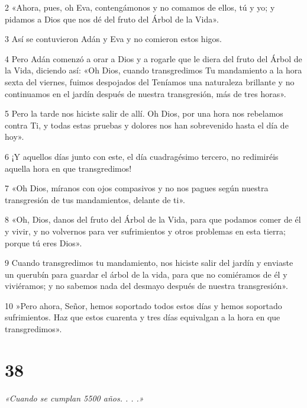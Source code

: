 \par 2 «Ahora, pues, oh Eva, contengámonos y no comamos de ellos, tú y yo; y pidamos a Dios que nos dé del fruto del Árbol de la Vida».

\par 3 Así se contuvieron Adán y Eva y no comieron estos higos.

\par 4 Pero Adán comenzó a orar a Dios y a rogarle que le diera del fruto del Árbol de la Vida, diciendo así: «Oh Dios, cuando transgredimos Tu mandamiento a la hora sexta del viernes, fuimos despojados del Teníamos una naturaleza brillante y no continuamos en el jardín después de nuestra transgresión, más de tres horas».

\par 5 Pero la tarde nos hiciste salir de allí. Oh Dios, por una hora nos rebelamos contra Ti, y todas estas pruebas y dolores nos han sobrevenido hasta el día de hoy».

\par 6 ¡Y aquellos días junto con este, el día cuadragésimo tercero, no redimiréis aquella hora en que transgredimos!

\par 7 «Oh Dios, míranos con ojos compasivos y no nos pagues según nuestra transgresión de tus mandamientos, delante de ti».

\par 8 «Oh, Dios, danos del fruto del Árbol de la Vida, para que podamos comer de él y vivir, y no volvernos para ver sufrimientos y otros problemas en esta tierra; porque tú eres Dios».

\par 9 Cuando transgredimos tu mandamiento, nos hiciste salir del jardín y enviaste un querubín para guardar el árbol de la vida, para que no comiéramos de él y viviéramos; y no sabemos nada del desmayo después de nuestra transgresión».

\par 10 »Pero ahora, Señor, hemos soportado todos estos días y hemos soportado sufrimientos. Haz que estos cuarenta y tres días equivalgan a la hora en que transgredimos».

\chapter{38}

\par \textit{«Cuando se cumplan 5500 años. . . .»}

